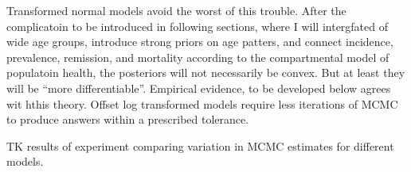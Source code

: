 Transformed normal models avoid the worst of this trouble.  After the
complicatoin to be introduced in following sections, where I will
intergfated of wide age groups, introduce strong priors on age
patters, and connect incidence, prevalence, remission, and mortality
according to the compartmental model of populatoin health, the
posteriors will not necessarily be convex.  But at least they will be
``more differentiable''.  Empirical evidence, to be developed below
agrees wit hthis theory.  Offset log transformed models require less
iterations of MCMC to produce answers within a prescribed tolerance.

TK results of experiment comparing variation in MCMC estimates for
different models.
